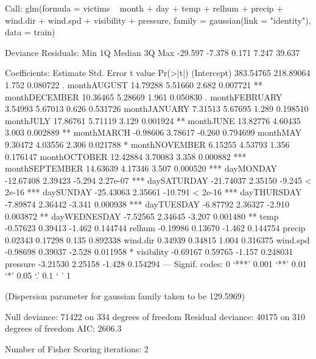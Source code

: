 \documentclass[11pt, a4paper]{article}
\begin{document}
\begin{Schunk}
\begin{Soutput}
Call:
glm(formula = victims ~ month + day + temp + relhum + precip + 
    wind.dir + wind.spd + visibility + pressure, family = gaussian(link = "identity"), 
    data = train)

Deviance Residuals: 
    Min       1Q   Median       3Q      Max  
-29.597   -7.378    0.171    7.247   39.637  

Coefficients:
                Estimate Std. Error t value Pr(>|t|)    
(Intercept)    383.54765  218.89064   1.752 0.080722 .  
monthAUGUST     14.79288    5.51660   2.682 0.007721 ** 
monthDECEMBER   10.36465    5.28669   1.961 0.050830 .  
monthFEBRUARY    3.54993    5.67013   0.626 0.531726    
monthJANUARY     7.31513    5.67695   1.289 0.198510    
monthJULY       17.86761    5.71119   3.129 0.001924 ** 
monthJUNE       13.82776    4.60435   3.003 0.002889 ** 
monthMARCH      -0.98606    3.78617  -0.260 0.794699    
monthMAY         9.30472    4.03556   2.306 0.021788 *  
monthNOVEMBER    6.15255    4.53793   1.356 0.176147    
monthOCTOBER    12.42884    3.70083   3.358 0.000882 ***
monthSEPTEMBER  14.63639    4.17346   3.507 0.000520 ***
dayMONDAY      -12.67408    2.39423  -5.294 2.27e-07 ***
daySATURDAY    -21.74037    2.35150  -9.245  < 2e-16 ***
daySUNDAY      -25.43063    2.35661 -10.791  < 2e-16 ***
dayTHURSDAY     -7.89874    2.36442  -3.341 0.000938 ***
dayTUESDAY      -6.87792    2.36327  -2.910 0.003872 ** 
dayWEDNESDAY    -7.52565    2.34645  -3.207 0.001480 ** 
temp            -0.57623    0.39413  -1.462 0.144744    
relhum          -0.19986    0.13670  -1.462 0.144754    
precip           0.02343    0.17298   0.135 0.892338    
wind.dir         0.34939    0.34815   1.004 0.316375    
wind.spd        -0.98698    0.39037  -2.528 0.011958 *  
visibility      -0.69167    0.59765  -1.157 0.248031    
pressure        -3.21530    2.25158  -1.428 0.154294    
---
Signif. codes:  0 ‘***’ 0.001 ‘**’ 0.01 ‘*’ 0.05 ‘.’ 0.1 ‘ ’ 1

(Dispersion parameter for gaussian family taken to be 129.5969)

    Null deviance: 71422  on 334  degrees of freedom
Residual deviance: 40175  on 310  degrees of freedom
AIC: 2606.3

Number of Fisher Scoring iterations: 2
\end{Soutput}
\end{Schunk}
\end{document}
